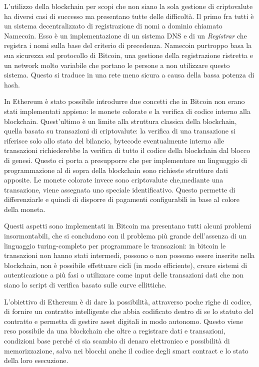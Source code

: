 	L'utilizzo della blockchain per scopi che non siano la sola gestione di criptovalute ha diversi casi di successo ma presentano tutte delle difficoltà.
	Il primo fra tutti è un sistema decentralizzato di registrazione di nomi a dominio chiamato Namecoin\cite{fromknecht2014certcoin}. Esso è un implementazione di un sistema DNS e di un \textit{Registrar} che registra i nomi sulla base del criterio di precedenza. Namecoin purtroppo basa la sua sicurezza sul protocollo di Bitcoin, una gestione della registrazione ristretta e un network molto variabile che portano le persone a non utilizzare questo sistema. Questo si traduce in una rete meno sicura a causa della bassa potenza di hash.

		
	In Ethereum è stato possibile introdurre due concetti che in Bitcoin non erano stati implementati appieno: le monete colorate e la verifica di codice interno alla blockchain. Quest'ultimo è un limite alla struttura classica della blockchain, quella basata su transazioni di criptovalute: la verifica di una transazione si riferisce solo allo stato del bilancio, bytecode eventualmente interno alle transazioni richiederebbe la verifica di tutto il codice della blockchain dal blocco di genesi\cite[SPV - Simplified Payment Verification]{nakamoto2008bitcoin}. Questo ci porta a presupporre che per implementare un linguaggio di programmazione al di sopra della blockchain sono richieste strutture dati apposite. Le monete colorate invece sono criptovalute che,mediante una transazione, viene assegnata uno speciale identificativo. Questo permette di differenziarle e quindi di disporre di pagamenti configurabili in base al colore della moneta.
	
	Questi aspetti sono implementati in Bitcoin ma presentano tutti alcuni problemi insormontabili, che si concludono con il problema più grande dell'assenza di un linguaggio turing-completo per programmare le transazioni: in bitcoin le transazioni non hanno stati intermedi, possono o non possono essere inserite nella blockchain, non è possibile effettuare cicli (in modo efficiente), creare sistemi di autenticazione a più fasi o utilizzare come input delle transazioni dati che non siano lo script di verifica basato sulle curve ellittiche.
	
	L'obiettivo di Ethereum è di dare la possibilità, attraverso poche righe di codice, di fornire un contratto intelligente che abbia codificato dentro di se lo statuto del contratto e permetta di gestire asset digitali in modo autonomo. 
	Questo viene reso possibile da una blockchain che oltre a registrare dati e transazioni, condizioni base perché ci sia scambio di denaro elettronico e possibilità di memorizzazione, salva nei blocchi anche il codice degli smart contract e lo stato della loro esecuzione\cite{yellowpaperethereum}.
	
